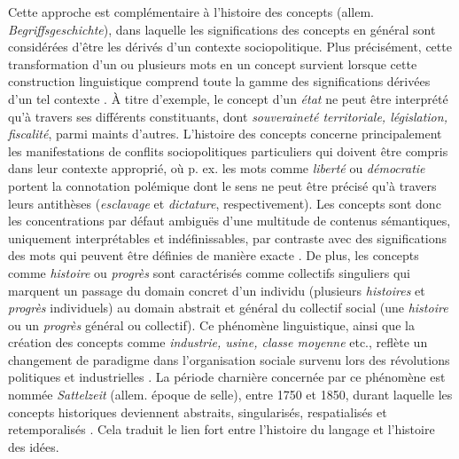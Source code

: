 Cette approche est complémentaire à l'histoire des concepts (allem. \textit{Begriffsgeschichte}), dans laquelle les significations des concepts en général sont considérées d'être les dérivés d'un contexte sociopolitique. Plus précisément, cette transformation d'un ou plusieurs mots en un concept survient lorsque cette construction linguistique comprend toute la gamme des significations dérivées d'un tel contexte \citep[p.~19]{koselleck2011introduction}. À titre d'exemple, le concept d'un \textit{état} ne peut être interprété qu'à travers ses différents constituants, dont \textit{souveraineté territoriale, législation, fiscalité}, parmi maints d'autres. L'histoire des concepts concerne principalement les manifestations de conflits sociopolitiques particuliers qui doivent être compris dans leur contexte approprié, où p. ex. les mots comme \textit{liberté} ou \textit{démocratie} portent la connotation polémique dont le sens ne peut être précisé qu'à travers leurs antithèses (\textit{esclavage} et \textit{dictature}, respectivement). Les concepts sont donc les concentrations par défaut ambiguës d'une multitude de contenus sémantiques, uniquement interprétables et indéfinissables, par contraste avec des significations des mots qui peuvent être définies de manière exacte \citep[p. 20]{koselleck2011introduction}. De plus, les concepts comme \textit{histoire} ou \textit{progrès} sont caractérisés comme \og{}collectifs singuliers\fg{} qui marquent un passage du domain concret d'un individu (plusieurs \textit{histoires} et \textit{progrès} individuels) au domain abstrait et général du collectif social (une \textit{histoire} ou un \textit{progrès} général ou collectif). Ce phénomène linguistique, ainsi que la création des concepts comme \textit{industrie, usine, classe moyenne} etc., reflète un changement de paradigme dans l'organisation sociale survenu lors des révolutions politiques et industrielles \citep[p. 1]{hobsbawm2010age}. La période charnière concernée par ce phénomène est nommée \textit{Sattelzeit} (allem. \og{}époque de selle\fg{}), entre 1750 et 1850, durant laquelle les concepts historiques deviennent abstraits, singularisés, respatialisés et retemporalisés \citep[pp.~34-35]{koselleck2011introduction}. Cela traduit le lien fort entre l'histoire du langage et l'histoire des idées.

